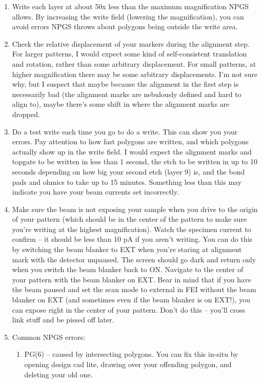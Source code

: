\begin{appendices}
\begin{enumerate}
	\item Write each layer at about 50x less than the maximum magnification NPGS allows. By increasing the write field (lowering the magnification), you can avoid errors NPGS throws about polygons being outside the write area.
	\item Check the relative displacement of your markers during the alignment step. For larger patterns, I would expect some kind of self-consistent translation and rotation, rather than some arbitrary displacement. For small patterns, at higher magnification there may be some arbitrary displacements. I’m not sure why, but I suspect that maybe because the alignment in the first step is necessarily bad (the alignment marks are nebulously defined and hard to align to), maybe there’s some shift in where the alignment marks are dropped.
	\item Do a test write each time you go to do a write. This can show you your errors. Pay attention to how fast polygons are written, and which polygons actually show up in the write field. I would expect the alignment marks and topgate to be written in less than 1 second, the etch to be written in up to 10 seconds depending on how big your second etch (layer 9) is, and the bond pads and ohmics to take up to 15 minutes. Something less than this may indicate you have your beam currents set incorrectly.
	\item Make sure the beam is not exposing your sample when you drive to the origin of your pattern (which should be in the center of the pattern to make sure you’re writing at the highest magnification). Watch the specimen current to confirm – it should be less than 10 pA if you aren’t writing. You can do this by switching the beam blanker to EXT when you’re staring at alignment mark with the detector unpaused. The screen should go dark and return only when you switch the beam blanker back to ON. Navigate to the center of your pattern with the beam blanker on EXT. Bear in mind that if you have the beam paused and set the scan mode to external in FEI without the beam blanker on EXT (and sometimes even if the beam blanker is on EXT!), you can expose right in the center of your pattern. Don’t do this – you’ll cross link stuff and be pissed off later.
	\item Common NPGS errors:
	\begin{enumerate}
		\item PG(6) – caused by intersecting polygons. You can fix this in-situ by opening design cad lite, drawing over your offending polygon, and deleting your old one.

\end{enumerate}
\end{enumerate}
\end{appendices}

